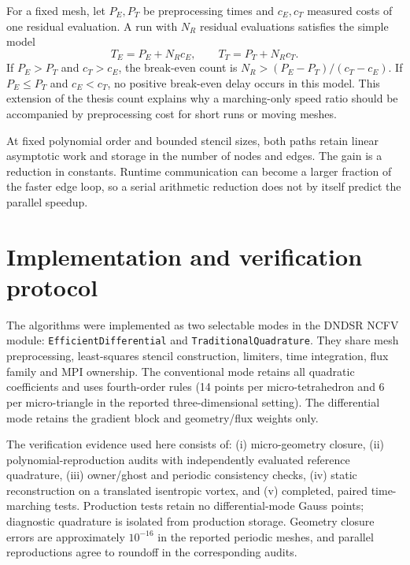\documentclass[11pt]{article}
\begin{document}
For a fixed mesh, let $P_E,P_T$ be preprocessing times and $c_E,c_T$ measured costs of one residual evaluation.  A run with $N_R$ residual evaluations satisfies the simple model
\begin{equation}
 T_E=P_E+N_Rc_E,\qquad T_T=P_T+N_Rc_T.
 \label{eq:amortization}
\end{equation}
If $P_E>P_T$ and $c_T>c_E$, the break-even count is
$N_R>(P_E-P_T)/(c_T-c_E)$.  If $P_E\le P_T$ and $c_E<c_T$, no positive break-even delay occurs in this model.  This extension of the thesis count explains why a marching-only speed ratio should be accompanied by preprocessing cost for short runs or moving meshes.

At fixed polynomial order and bounded stencil sizes, both paths retain linear asymptotic work and storage in the number of nodes and edges.  The gain is a reduction in constants.  Runtime communication can become a larger fraction of the faster edge loop, so a serial arithmetic reduction does not by itself predict the parallel speedup.

\section{Implementation and verification protocol}\label{sec:implementation}

The algorithms were implemented as two selectable modes in the DNDSR NCFV module: \texttt{Efficient\allowbreak Differential} and \texttt{Traditional\allowbreak Quadrature}.  They share mesh preprocessing, least-squares stencil construction, limiters, time integration, flux family and MPI ownership.  The conventional mode retains all quadratic coefficients and uses fourth-order rules (14 points per micro-tetrahedron and 6 per micro-triangle in the reported three-dimensional setting).  The differential mode retains the gradient block and geometry/flux weights only.

The verification evidence used here consists of: (i) micro-geometry closure, (ii) polynomial-reproduction audits with independently evaluated reference quadrature, (iii) owner/ghost and periodic consistency checks, (iv) static reconstruction on a translated isentropic vortex, and (v) completed, paired time-marching tests.  Production tests retain no differential-mode Gauss points; diagnostic quadrature is isolated from production storage.  Geometry closure errors are approximately $10^{-16}$ in the reported periodic meshes, and parallel reproductions agree to roundoff in the corresponding audits.
\end{document}
